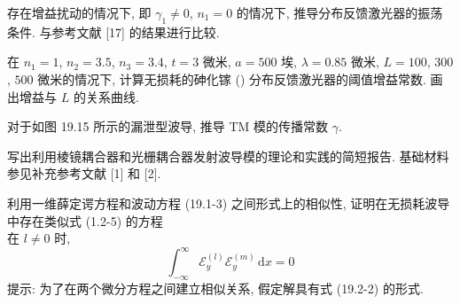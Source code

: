 \documentclass{note}
\begin{document}
\begin{exe}
    存在增益扰动的情况下, 即 $\gamma_1\neq 0$, $n_1=0$ 的情况下, 推导分布反馈激光器的振荡条件. 与参考文献 [17] 的结果进行比较.
\end{exe}
\begin{sol}
    
\end{sol}

\begin{exe}
    在 $n_1=1$, $n_2=3.5$, $n_3=3.4$, $t=3$ 微米, $a=500$ 埃, $\lambda=0.85$ 微米, $L=100$, $300$, $500$ 微米的情况下, 计算无损耗的砷化镓 () 分布反馈激光器的阈值增益常数. 画出增益与 $L$ 的关系曲线.
\end{exe}
\begin{sol}
    
\end{sol}

\begin{exe}
    对于如图 19.15 所示的漏泄型波导, 推导 TM 模的传播常数 $\gamma$.
\end{exe}
\begin{sol}
    
\end{sol}

\begin{exe}
    写出利用棱镜耦合器和光栅耦合器发射波导模的理论和实践的简短报告. 基础材料参见补充参考文献 [1] 和 [2].
\end{exe}
\begin{sol}
\end{sol}

\begin{exe}
    利用一维薛定谔方程和波动方程 (19.1-3) 之间形式上的相似性, 证明在无损耗波导中存在类似式 (1.2-5) 的方程\\
    在 $l\neq 0$ 时,
    \[
        \int_{-\infty}^{\infty}\mathcal{E}_y^{(l)}\mathcal{E}_y^{(m)}\,\mathrm{d}x=0
    \]
    提示: 为了在两个微分方程之间建立相似关系, 假定解具有式 (19.2-2) 的形式.
\end{exe}
\begin{pf}
    
\end{pf}
\ifx\allfiles\undefined
\end{document}
